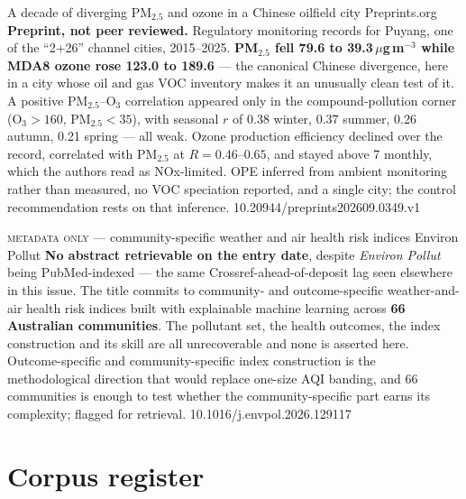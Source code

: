 \documentclass[10pt]{article}
\begin{document}

{A decade of diverging PM$_{2.5}$ and ozone in a Chinese oilfield city}
{Preprints.org}
{\textbf{Preprint, not peer reviewed.} Regulatory monitoring records for Puyang, one of the
``2+26'' channel cities, 2015--2025. \textbf{PM$_{2.5}$ fell 79.6 to 39.3\,$\mu$g\,m$^{-3}$
while MDA8 ozone rose 123.0 to 189.6} --- the canonical Chinese divergence, here in a city
whose oil and gas VOC inventory makes it an unusually clean test of it. A positive
PM$_{2.5}$--O$_3$ correlation appeared only in the compound-pollution corner (O$_3 >
160$, PM$_{2.5} < 35$), with seasonal $r$ of 0.38 winter, 0.37 summer, 0.26 autumn, 0.21
spring --- all weak. Ozone production efficiency declined over the record, correlated with
PM$_{2.5}$ at $R=0.46$--$0.65$, and stayed above 7 monthly, which the authors read as
NOx-limited. OPE inferred from ambient monitoring rather than measured, no VOC speciation
reported, and a single city; the control recommendation rests on that inference.}
{10.20944/preprints202609.0349.v1}

{\textsc{metadata only} --- community-specific weather and air health risk indices}
{Environ Pollut}
{\textbf{No abstract retrievable on the entry date}, despite \textit{Environ Pollut} being
PubMed-indexed --- the same Crossref-ahead-of-deposit lag seen elsewhere in this issue. The
title commits to community- and outcome-specific weather-and-air health risk indices built
with explainable machine learning across \textbf{66 Australian communities}. The pollutant
set, the health outcomes, the index construction and its skill are all unrecoverable and none
is asserted here. Outcome-specific and community-specific index construction is the
methodological direction that would replace one-size AQI banding, and 66 communities is
enough to test whether the community-specific part earns its complexity; flagged for
retrieval.}
{10.1016/j.envpol.2026.129117}

\section*{\sffamily\bfseries\color{Deep}Corpus register}
\vspace{-1.5mm}{\color{Amber}\rule{\linewidth}{1.1pt}}\vspace{2.5mm}
\end{document}

